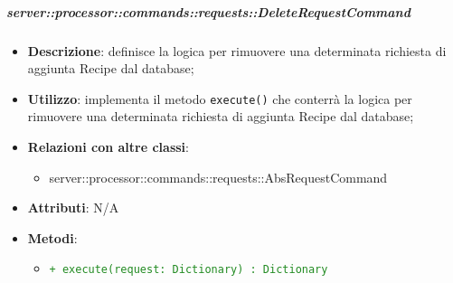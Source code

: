         \subparagraph{server::processor::commands::requests::DeleteRequestCommand} %
        \label{subp:bdsm_app_server_processor_commands_requests_deleterequestcommand}
        \begin{itemize}
          \item \textbf{Descrizione}: definisce la logica per rimuovere una determinata richiesta di aggiunta Recipe dal database;
          \item \textbf{Utilizzo}: implementa il metodo \texttt{execute()} che conterrà la logica per rimuovere una determinata richiesta di aggiunta Recipe dal database;
          \item \textbf{Relazioni con altre classi}:
            \begin{itemize}
              \item server::processor::commands::requests::AbsRequestCommand
            \end{itemize}
          \item \textbf{Attributi}: N/A
          \item \textbf{Metodi}:
          \begin{itemize}
              \item \textcolor{forestgreen}{\texttt{+ execute(request: Dictionary) : Dictionary}}
          \end{itemize}
        \end{itemize}


